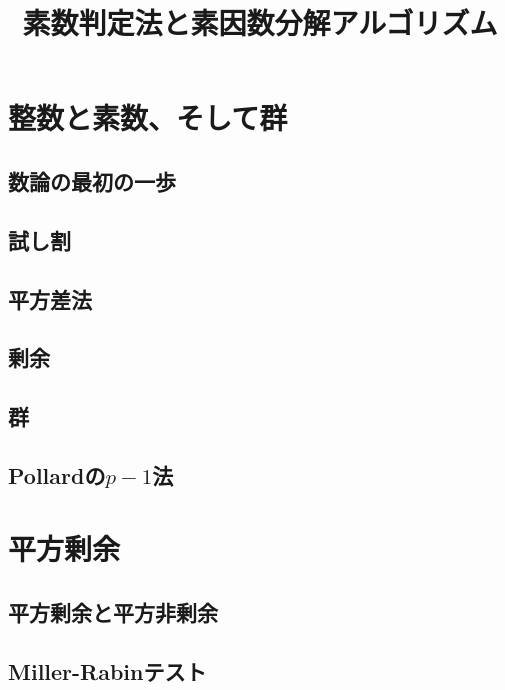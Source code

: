 
\title{素数判定法と素因数分解アルゴリズム}
\author{}
\date{}
\makeindex

\setcounter{notesNum}{1}
\maketitle
\begin{multicols}{2}
\setcounter{tocdepth}{2}
\tableofcontents
\end{multicols}
\newpage

\section{整数と素数、そして群}
\subsection{数論の最初の一歩}

\subsection{試し割}

\subsection{平方差法}

\subsection{剰余}

\subsection{群}

\subsection{Pollardの$p-1$法}


\section{平方剰余}
\subsection{平方剰余と平方非剰余}

\subsection{Miller-Rabinテスト}

